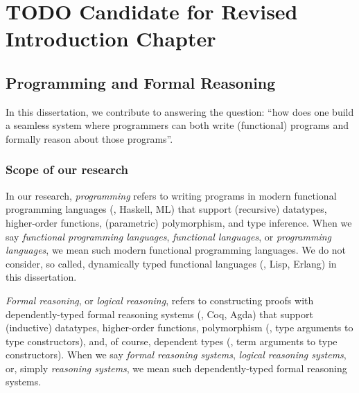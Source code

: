 \chapter{TODO Candidate for Revised Introduction Chapter}
\label{APP:ch:intro}

\section{Programming and Formal Reasoning}\label{APP:sec:intro:motiv}
In this dissertation, we contribute to answering the question:
``how does one build a seamless system where programmers can both
write (functional) programs and formally reason about those programs''.

\subsection*{Scope of our research}
In our research, \emph{programming} refers to writing programs in
modern functional programming languages (\eg, Haskell, ML) that support
(recursive) datatypes, higher-order functions, (parametric) polymorphism,
and type inference. When we say \emph{functional programming languages},
\emph{functional languages}, or \emph{programming languages},
we mean such modern functional programming languages. We do not consider,
so called, dynamically typed functional languages (\eg, Lisp, Erlang)
in this dissertation.

\emph{Formal reasoning}, or \emph{logical reasoning},
refers to constructing proofs with dependently-typed formal reasoning systems
(\eg, Coq, Agda) that support (inductive) datatypes, higher-order functions,
polymorphism (\ie, type arguments to type constructors), and, of course,
dependent types (\ie, term arguments to type constructors). When we say
\emph{formal reasoning systems}, \emph{logical reasoning systems},
or, simply \emph{reasoning systems}, we mean such dependently-typed
formal reasoning systems.

